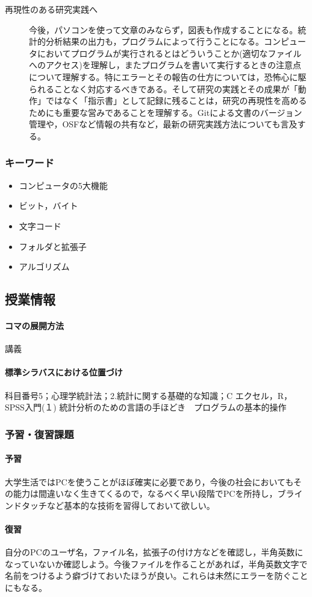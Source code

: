 \begin{description}
    \item[再現性のある研究実践へ]今後，パソコンを使って文章のみならず，図表も作成することになる。統計的分析結果の出力も，プログラムによって行うことになる。コンピュータにおいてプログラムが実行されるとはどういうことか(適切なファイルへのアクセス)を理解し，またプログラムを書いて実行するときの注意点について理解する。特にエラーとその報告の仕方については，恐怖心に駆られることなく対応するべきである。そして研究の実践とその成果が「動作」ではなく「指示書」として記録に残ることは，研究の再現性を高めるためにも重要な営みであることを理解する。Gitによる文書のバージョン管理や，OSFなど情報の共有など，最新の研究実践方法についても言及する。

\end{description}
\subsubsection{キーワード}
\begin{itemize}
\item コンピュータの5大機能
\item ビット，バイト
\item 文字コード
\item フォルダと拡張子
\item アルゴリズム
\end{itemize}
\subsection{授業情報}
\paragraph{コマの展開方法}
講義
\paragraph{標準シラバスにおける位置づけ}
科目番号5；心理学統計法；2.統計に関する基礎的な知識；C エクセル，R，SPSS入門(１) 統計分析のための言語の手ほどき　プログラムの基本的操作
\subsubsection{予習・復習課題}
\paragraph{予習}大学生活ではPCを使うことがほぼ確実に必要であり，今後の社会においてもその能力は間違いなく生きてくるので，なるべく早い段階でPCを所持し，ブラインドタッチなど基本的な技術を習得しておいて欲しい。
\paragraph{復習}自分のPCのユーザ名，ファイル名，拡張子の付け方などを確認し，半角英数になっていないか確認しよう。今後ファイルを作ることがあれば，半角英数文字で名前をつけるよう癖づけておいたほうが良い。これらは未然にエラーを防ぐことにもなる。
